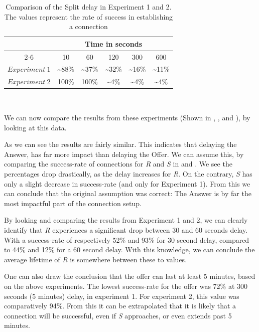 %
\begin{table}
	\caption[Comparison of Split delay]{Comparison of the Split delay in Experiment 1 and 2. The values represent the rate of success in establishing a connection}
	\label{tab:comp_split}
	\centering
	\begin{tabular}{c@{\qquad}ccccc}
      	\multirow{3}{*}{\raisebox{-\heavyrulewidth}{Split~delay}} & \multicolumn{5}{c}{Time in seconds}\\
	  	\cmidrule{2-6}
        & 10 & 60 & 120 & 300 & 600\\
        \midrule
        $Experiment~1$ & \textasciitilde88\% & \textasciitilde37\% & \textasciitilde32\% & \textasciitilde16\% & \textasciitilde11\% \\
        $Experiment~2$ & 100\% & 100\% & \textasciitilde4\% & \textasciitilde4\% & \textasciitilde4\% \\
        \bottomrule
	\end{tabular}\\
\end{table}
%
We can now compare the results from these experiments (Shown in  , ,  and ), by looking at this data.

As we can see the results are fairly similar. This indicates that delaying the Answer, has far more impact than delaying the Offer. We can assume this, by comparing the success-rate of connections for \textit{R} and \textit{S} in  and . We see the percentages drop drastically, as the delay increases for \textit{R}. On the contrary, \textit{S} has only a slight decrease in success-rate (and only for Experiment 1). From this we can conclude that the original assumption was correct: The Answer is by far the most impactful part of the connection setup.

By looking and comparing the results from Experiment 1 and 2, we can clearly identify that \textit{R} experiences a significant drop between 30 and 60 seconds delay. With a success-rate of respectively 52\% and 93\% for 30 second delay, compared to 44\% and 12\% for a 60 second delay. With this knowledge, we can conclude the average lifetime of \textit{R} is somewhere between these to values.

One can also draw the conclusion that the offer can last at least 5 minutes, based on the above experiments. The lowest success-rate for the offer was 72\% at 300 seconds (5 minutes) delay, in experiment 1. For experiment 2, this value was comparatively 94\%. From this it can be extrapolated that it is likely that a connection will be successful, even if \textit{S} approaches, or even extends past 5 minutes.

